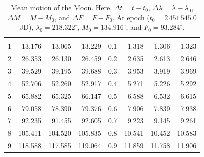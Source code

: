 \begin{table}[!h]
\begin{tabular}{rrrr|rrrr}
&&&&&&&\\
1 &  13.176 &  13.065 &  13.229 & 0.1 &   1.318 &   1.306 &   1.323\\
2 &  26.353 &  26.130 &  26.459 & 0.2 &   2.635 &   2.613 &   2.646\\
3 &  39.529 &  39.195 &  39.688 & 0.3 &   3.953 &   3.919 &   3.969\\
4 &  52.706 &  52.260 &  52.917 & 0.4 &   5.271 &   5.226 &   5.292\\
5 &  65.882 &  65.325 &  66.147 & 0.5 &   6.588 &   6.532 &   6.615\\
6 &  79.058 &  78.390 &  79.376 & 0.6 &   7.906 &   7.839 &   7.938\\
7 &  92.235 &  91.455 &  92.605 & 0.7 &   9.223 &   9.145 &   9.261\\
8 & 105.411 & 104.520 & 105.835 & 0.8 &  10.541 &  10.452 &  10.583\\
9 & 118.588 & 117.585 & 119.064 & 0.9 &  11.859 &  11.758 &  11.906\\
\end{tabular}
\caption{Mean motion of the Moon.  Here, $\Delta t = t-t_0$, $\Delta\bar{\lambda} = \bar{\lambda}-\bar{\lambda}_0$, $\Delta M = M - M_0$, and $\Delta\bar{F}= \bar{F}-\bar{F}_0$. 
At epoch  ($t_0 = 2\,451\,545.0$ JD), $\bar{\lambda}_0 = 218.322^\circ$, $M_0 = 134.916^\circ$,
and $\bar{F}_0 = 93.284^\circ$.}\label{tmoonm}
\end{table}

